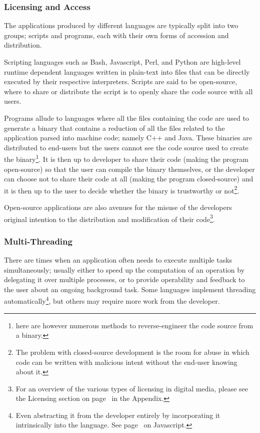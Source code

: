 \subsubsection{Licensing and Access}

The applications produced by different languages are typically split into two groups; scripts and programs, each with their own forms of accession and distribution.

Scripting languages such as Bash, Javascript, Perl, and Python \cite{vanrossum2010python} are high-level runtime dependent languages written in plain-text into files that can be directly executed by their respective interpreters. Scripts are said to be open-source, where to share or distribute the script is to openly share the code source with all users.

Programs allude to languages where all the files containing the code are used to generate a binary that contains a reduction of all the files related to the application parsed into machine code; namely C++ and Java. These binaries are distributed to end-users but the users cannot see the code source used to create the binary\footnote{here are however numerous methods to reverse-engineer the code source from a binary.}. It is then up to developer to share their code (making the program open-source) so that the user can compile the binary themselves, or the developer can choose not to share their code at all (making the program closed-source) and it is then up to the user to decide whether the binary is trustworthy or not\footnote{The problem with closed-source development is the room for abuse in which code can be written with malicious intent without the end-user knowing about it.}.

Open-source applications are also avenues for the misuse of the developers original intention to the distribution and modification of their code\footnote{For an overview of the various types of licensing in digital media, please see the Licensing section on page~\pageref{ref:app:licensing} in the Appendix.}.

\subsubsection{Multi-Threading}

There are times when an application often needs to execute multiple tasks simultaneously; usually either to speed up the computation of an operation by delegating it over multiple processes, or to provide operability and feedback to the user about an ongoing background task. Some languages implement threading automatically\footnote{Even abstracting it from the developer entirely by incorporating it intrinsically into the language. See page~\pageref{ref:haplo:javaover} on Javascript.}, but others may require more work from the developer.

